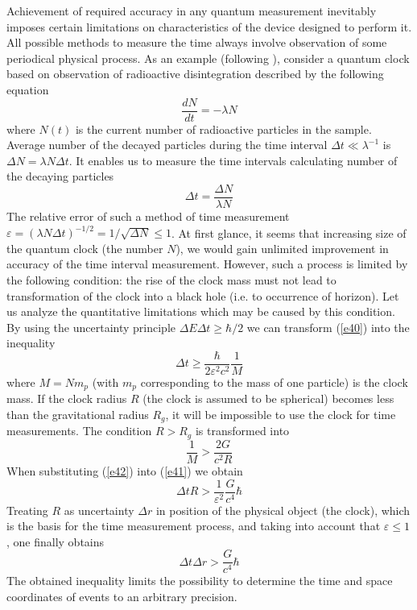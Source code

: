 \documentclass [12pt]{article}
\begin{document}
Achievement of required accuracy in any quantum measurement inevitably imposes certain limitations on characteristics of the device designed to perform it. All possible methods to measure the time always involve observation of some periodical physical process. As an example (following \cite{s33}), consider a quantum clock based on observation of radioactive disintegration described by the following equation
\begin{equation}\label{e39}
  \frac{{dN}}{{dt}} =  - \lambda N
\end{equation}
where $N(t)$ is the current number of radioactive particles in the sample. Average number of the decayed particles  during the time interval $\Delta t \ll {\lambda ^{ - 1}}$ is $\Delta N = \lambda N\Delta t$. It enables us to measure the time intervals calculating number of the decaying particles
\begin{equation}\label{e40}
  \Delta t = \frac{{\Delta N}}{{\lambda N}}
\end{equation}
The relative error of such a method of time measurement $\varepsilon  = {\left( {\lambda N\Delta t} \right)^{ - 1/2}} = 1/\sqrt {\Delta N}  \le 1$. At first  glance, it seems that increasing size of the quantum clock (the number $N$), we would gain unlimited improvement in accuracy of the time interval measurement. However, such a process is limited by the following condition: the rise of the clock mass must not lead to transformation of the clock into a black hole (i.e. to occurrence of  horizon). Let us analyze the quantitative limitations  which may be caused by this condition.
By using the uncertainty principle $\Delta E\Delta t \ge \hbar /2$ we can transform  (\ref{e40}) into the inequality
\begin{equation}\label{e41}
  \Delta t \ge \frac{\hbar }{{2{\varepsilon ^2}{c^2}}}\frac{1}{M}
\end{equation}
where $M = N{m_p}$ (with ${m_p}$ corresponding to  the mass of one particle) is the clock mass. If the clock radius $R$ (the clock is assumed to be spherical) becomes less than the gravitational radius  ${R_g}$, it will be impossible to use the clock for time measurements. The condition  $R > {R_g}$ is transformed into
\begin{equation}\label{e42}
  \frac{1}{M} > \frac{{2G}}{{{c^2}R}}
\end{equation}
When substituting  (\ref{e42})  into (\ref{e41}) we obtain
\begin{equation}\label{e43}
  \Delta tR > \frac{1}{{{\varepsilon ^2}}}\frac{G}{{{c^4}}}\hbar
\end{equation}
Treating $R$  as uncertainty $\Delta r$  in position of the physical object (the clock), which is the basis for the time measurement process, and taking into account that $\varepsilon  \le 1$ , one finally obtains \cite{s33}
\begin{equation}\label{e44}
  \Delta t\Delta r > \frac{G}{{{c^4}}}\hbar
\end{equation}
The obtained inequality limits the possibility to determine the time and space coordinates of events to an arbitrary precision.
\end{document}

